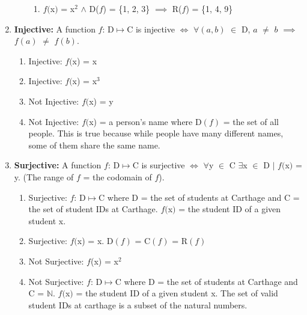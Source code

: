 \documentclass[12pt]{article}
\begin{document}
\begin{enumerate}
    \begin{enumerate}\begin{enumerate}
            \item \(f(\)x\()\) = x\(^2\) \(\land\) D(\(f\)) = \{1, 2, 3\} \(\implies\) R(\(f\)) = \{1, 4, 9\)\}
    \end{enumerate}\end{enumerate}
    \item\textbf{Injective: }A function \(f\): D\(\mapsto\)C is injective \(\iff\) \(\forall\)\((a, b)\) \(\in\) D, \(a\) \(\neq\) \(b\) \(\implies\) \(f(a)\) \(\neq\) \(f(b)\).
    \begin{enumerate} \begin{enumerate}
            \item Injective: \(f(\)x\(\))\) = x
            \item Injective: \(f(\)x) = x\(^3\)
            \item Not Injective: \(f(\)x) = y
            \item Not Injective: \(f(\)x) = a person's name where D$(f)$ = the set of all people. This is true because while people have many different names, some of them share the same name.
    \end{enumerate}\end{enumerate}
    \item\textbf{Surjective: }A function \(f\): D\(\mapsto\)C is surjective \(\iff\) \(\forall\)y \(\in\) C \(\exists\)x \(\in\) D \(\vert\) \(f(\)x\()\) = y. (The range of \(f\) = the codomain of \(f\)).
    \begin{enumerate} \begin{enumerate}
            \item Surjective: \(f\): D\(\mapsto\)C where D = the set of students at Carthage and C = the set of student IDs at Carthage. \(f(\)x\()\) = the student ID of a given student x.
            \item Surjective: \(f(\)x\(\))\) = x. D\((f)\) = C\((f)\) = R\((f)\)
            \item Not Surjective: \(f\)(x) = x\(^2\)
            \item Not Surjective: \(f\): D\(\mapsto\)C where D = the set of students at Carthage and C = $\mathbb{N}$. \(f(\)x\()\) = the student ID of a given student x. The set of valid student IDs at carthage is a subset of the natural numbers.
    \end{enumerate}\end{enumerate}
\end{enumerate}
\end{document}
